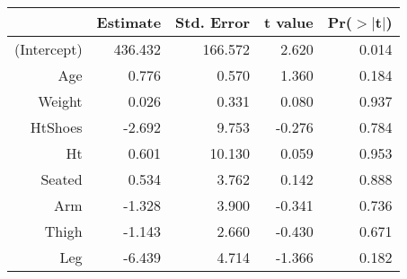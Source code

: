 \begin{table}[ht]
\centering
\begin{tabular}{rrrrr}
  \hline
 & Estimate & Std. Error & t value & Pr($>$$|$t$|$) \\ 
  \hline
(Intercept) & 436.432 & 166.572 & 2.620 & 0.014 \\ 
  Age & 0.776 & 0.570 & 1.360 & 0.184 \\ 
  Weight & 0.026 & 0.331 & 0.080 & 0.937 \\ 
  HtShoes & -2.692 & 9.753 & -0.276 & 0.784 \\ 
  Ht & 0.601 & 10.130 & 0.059 & 0.953 \\ 
  Seated & 0.534 & 3.762 & 0.142 & 0.888 \\ 
  Arm & -1.328 & 3.900 & -0.341 & 0.736 \\ 
  Thigh & -1.143 & 2.660 & -0.430 & 0.671 \\ 
  Leg & -6.439 & 4.714 & -1.366 & 0.182 \\ 
   \hline
\end{tabular}
\end{table}
